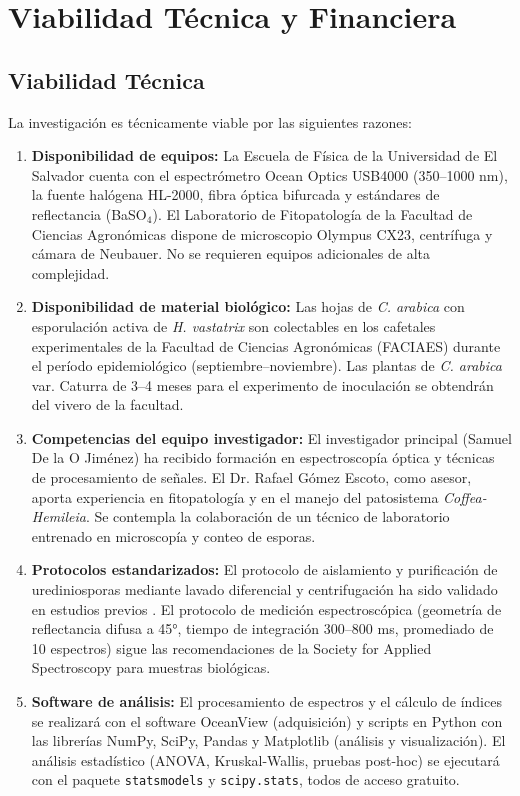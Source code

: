 \documentclass[12pt, a4paper]{article}
\begin{document}
	\section{Viabilidad Técnica y Financiera}
	
	\subsection{Viabilidad Técnica}
	
	La investigación es técnicamente viable por las siguientes razones:
	
	\begin{enumerate}
		\item \textbf{Disponibilidad de equipos:} La Escuela de Física de la Universidad de El Salvador cuenta con el espectrómetro Ocean Optics USB4000 (350--1000 nm), la fuente halógena HL-2000, fibra óptica bifurcada y estándares de reflectancia (BaSO$_4$). El Laboratorio de Fitopatología de la Facultad de Ciencias Agronómicas dispone de microscopio Olympus CX23, centrífuga y cámara de Neubauer. No se requieren equipos adicionales de alta complejidad.
		
		\item \textbf{Disponibilidad de material biológico:} Las hojas de \textit{C. arabica} con esporulación activa de \textit{H. vastatrix} son colectables en los cafetales experimentales de la Facultad de Ciencias Agronómicas (FACIAES) durante el período epidemiológico (septiembre--noviembre). Las plantas de \textit{C. arabica} var. Caturra de 3--4 meses para el experimento de inoculación se obtendrán del vivero de la facultad.
		
		\item \textbf{Competencias del equipo investigador:} El investigador principal (Samuel De la O Jiménez) ha recibido formación en espectroscopía óptica y técnicas de procesamiento de señales. El Dr. Rafael Gómez Escoto, como asesor, aporta experiencia en fitopatología y en el manejo del patosistema \textit{Coffea-Hemileia}. Se contempla la colaboración de un técnico de laboratorio entrenado en microscopía y conteo de esporas.
		
		\item \textbf{Protocolos estandarizados:} El protocolo de aislamiento y purificación de urediniosporas mediante lavado diferencial y centrifugación ha sido validado en estudios previos \parencite{Silva2006}. El protocolo de medición espectroscópica (geometría de reflectancia difusa a 45°, tiempo de integración 300--800 ms, promediado de 10 espectros) sigue las recomendaciones de la Society for Applied Spectroscopy para muestras biológicas.
		
		\item \textbf{Software de análisis:} El procesamiento de espectros y el cálculo de índices se realizará con el software OceanView (adquisición) y scripts en Python con las librerías NumPy, SciPy, Pandas y Matplotlib (análisis y visualización). El análisis estadístico (ANOVA, Kruskal-Wallis, pruebas post-hoc) se ejecutará con el paquete \texttt{statsmodels} y \texttt{scipy.stats}, todos de acceso gratuito.
	\end{enumerate}
	
\end{document}
